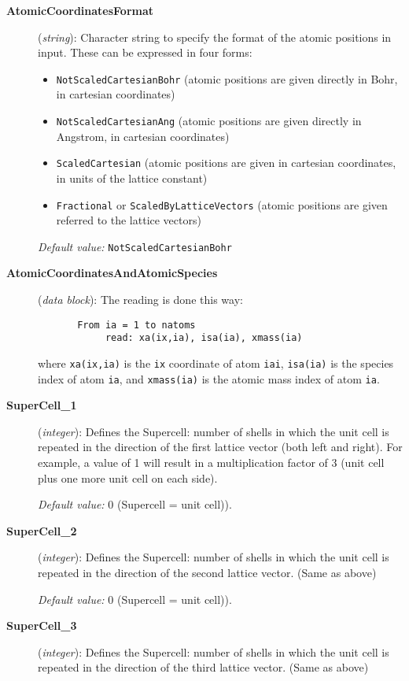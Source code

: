 \begin{description}
\item[{\bf AtomicCoordinatesFormat}] ({\it string}): 
Character string to specify the format of the atomic positions in
input. These can be expressed in four forms:
\begin{itemize}
\item {\tt NotScaledCartesianBohr} (atomic positions are given directly in
Bohr, in cartesian coordinates)
\item {\tt NotScaledCartesianAng} (atomic positions are given directly in
Angstrom, in cartesian coordinates)
\item {\tt ScaledCartesian} (atomic positions are given 
in cartesian coordinates, in units of the lattice constant)
\item {\tt Fractional} or {\tt ScaledByLatticeVectors} (atomic positions 
are given referred to the lattice vectors)
\end{itemize}

{\it Default value:} {\tt NotScaledCartesianBohr}



\item[{\bf AtomicCoordinatesAndAtomicSpecies}] ({\it data block}): 
The reading is done this way:
\begin{verbatim}
       From ia = 1 to natoms
            read: xa(ix,ia), isa(ia), xmass(ia)
\end{verbatim}
where {\tt xa(ix,ia)} is the {\tt ix} coordinate of atom 
{\tt iai}, {\tt isa(ia)} is the species index of atom {\tt ia}, and
{\tt xmass(ia)} is the atomic mass  index of atom {\tt ia}.

\item[{\bf SuperCell\_1}] ({\it integer}): 
Defines the Supercell:
number of shells in which the unit cell is repeated in the 
direction of the first lattice vector (both left and right). For
example, a value of 1 will result in a multiplication factor of 3
(unit cell plus one more unit cell on each side).

{\it Default value:} 0 (Supercell = unit cell)).

\item[{\bf SuperCell\_2}] ({\it integer}): 
Defines the Supercell:
number of shells in which the unit cell is repeated in the 
direction of the second lattice vector. (Same as above)

{\it Default value:} 0 (Supercell = unit cell)).

\item[{\bf SuperCell\_3}] ({\it integer}): 
Defines the Supercell:
number of shells in which the unit cell is repeated in the 
direction of the third lattice vector.  (Same as above)


\end{description}
